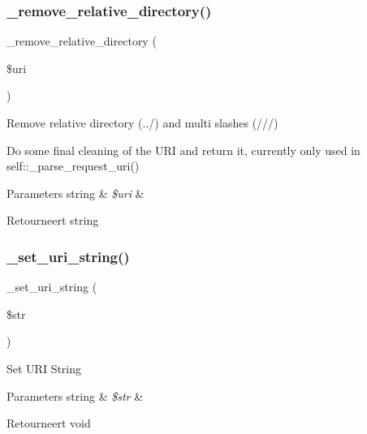 \subsubsection{\texorpdfstring{\_remove\_relative\_directory()}{\_remove\_relative\_directory()}}
{\footnotesize\ttfamily \+\_\+remove\+\_\+relative\+\_\+directory (\begin{DoxyParamCaption}\item[{}]{\$uri }\end{DoxyParamCaption})\hspace{0.3cm}{\ttfamily [protected]}}

Remove relative directory (../) and multi slashes (///)

Do some final cleaning of the U\+RI and return it, currently only used in self\+::\+\_\+parse\+\_\+request\+\_\+uri()


\begin{DoxyParams}[1]{Parameters}
string & {\em \$uri} & \\
\hline
\end{DoxyParams}
\begin{DoxyReturn}{Retourneert}
string 
\end{DoxyReturn}
\mbox{\label{class_c_i___u_r_i_a81a4c4d50fbac24b9ae091f9cfcaade3}} 
\subsubsection{\texorpdfstring{\_set\_uri\_string()}{\_set\_uri\_string()}}
{\footnotesize\ttfamily \+\_\+set\+\_\+uri\+\_\+string (\begin{DoxyParamCaption}\item[{}]{\$str }\end{DoxyParamCaption})\hspace{0.3cm}{\ttfamily [protected]}}

Set U\+RI String


\begin{DoxyParams}[1]{Parameters}
string & {\em \$str} & \\
\hline
\end{DoxyParams}
\begin{DoxyReturn}{Retourneert}
void 
\end{DoxyReturn}
\mbox{\label{class_c_i___u_r_i_a98974ace6ccf1b5e0923a7de9018095a}} 
